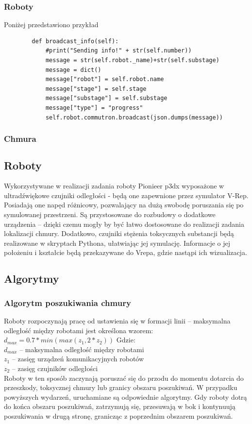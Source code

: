 \documentclass[a4paper, 12pt]{article}
\begin{document}
	\subsubsection{Roboty}
	Poniżej przedstawiono przykład 
	\begin{verbatim}
	    def broadcast_info(self):
	        #print("Sending info!" + str(self.number))
	        message = str(self.robot._name)+str(self.substage)
	        message = dict()
	        message["robot"] = self.robot.name
	        message["stage"] = self.stage
	        message["substage"] = self.substage
	        message["type"] = "progress"
	        self.robot.commutron.broadcast(json.dumps(message))
	\end{verbatim}
	\subsubsection{Chmura}
	
	
	\subsection{Roboty}
	Wykorzystywane w realizacji zadania roboty Pionieer p3dx wyposażone w ultradźwiękowe czujniki odległości - będą one zapewnione przez symulator V-Rep. Posiadają one napęd różnicowy, pozwalający na dużą swobodę poruszania się po symulowanej przestrzeni. Są przystosowane do rozbudowy o dodatkowe urządzenia -- dzięki czemu mogły by być łatwo dostosowane do realizacji zadania lokalizacji chmury.
	Dodatkowo, czujniki stężenia toksycznych substancji będą realizowane w skryptach Pythona, ułatwiając jej symulację. Informacje o jej położeniu i kształcie będą przekazywane do Vrepa, gdzie nastąpi ich wizualizacja.
	\subsection{Algorytmy}
	
	\subsubsection{Algorytm poszukiwania chmury}
	Roboty rozpoczynają pracę od ustawienia się w formacji linii -- maksymalna odległość między robotami jest określona wzorem:
	\begin{math}
	d_{max} = 0.7*min(max(z_1,2*z_2))
	\end{math}
	Gdzie:\\
	$d_{max}$ -- maksymalna odległość między robotami\\
	$z_1$ -- zasięg urządzeń komunikacyjnych robotów\\
	$z_2$ -- zasięg czujników odległości\\
	Roboty w ten sposób zaczynają poruszać się do przodu do momentu dotarcia do przeszkody, toksycznej chmury lub granicy obszaru poszukiwań. W przypadku powyższych wydarzeń, uruchamiane są odpowiednie algorytmy.
	Gdy roboty dotrą do końca obszaru poszukiwań, zatrzymują się, przesuwają w bok i kontynuują poszukiwania w drugą stronę, granicząc z poprzednim obszarem poszukiwań.
\end{document}
